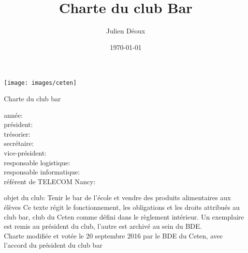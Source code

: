 \documentclass{article} %
\title{Charte du club Bar}
\author{Julien Déoux}
\date\today
\begin{document}
	

	\begin{titlepage}
		\begin{center}
			\texttt{[image: images/ceten]}\par
			\vspace{2cm}
			{\Huge \light{} Charte du club bar}\par
			\vfill
			\begin{spacing}{1.5}
				année: \underline{\hspace{2cm}}\\
				président: \underline{\hspace{8cm}}\\
				trésorier: \underline{\hspace{8cm}}\\
				secrétaire: \underline{\hspace{8cm}}\\
				vice-président: \underline{\hspace{8cm}}\\
				responsable logistique: \underline{\hspace{8cm}}\\
				responsable informatique: \underline{\hspace{8cm}}\\
				référent de TELECOM Nancy: \underline{\hspace{8cm}}\\
			\end{spacing}
			\vspace{\baselineskip}
			objet du club: Tenir le bar de l'école et vendre des produits
			alimentaires aux élèves
			\vfill
			{\footnotesize \light{} Ce texte régit le fonctionnement, les
			obligations et les droits attribués au club bar, club du Ceten comme
			défini dans le règlement intérieur. Un exemplaire est remis au
			président du club, l’autre est archivé au sein du BDE\@. \\
			Charte modifiée et votée le 20 septembre 2016 par le BDE du Ceten,
			avec l'accord du président du club bar}
		\end{center}
	\end{titlepage}


\end{document}
